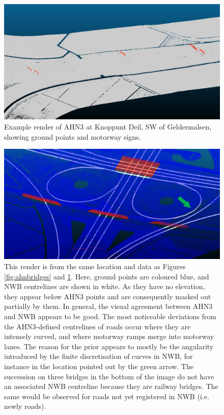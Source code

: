 \begin{figure}[h!]
    \centering
    \includegraphics[width=\linewidth]{final_report/figs/ahn_sample_02.png} 
    \caption{Example render of AHN3 at Knoppunt Deil, SW of Geldermalsen, showing ground points and motorway signs.}
    \label{fig:ahnsigns}
\end{figure}

\begin{figure}[h!]
    \centering
    \includegraphics[width=\linewidth]{final_report/figs/ahn_sample_04_a.png} 
    \caption{This render is from the same location and data as Figures \ref{fig:ahnbridges} and \ref{fig:ahnsigns}. Here, ground points are coloured blue, and NWB centrelines are shown in white. As they have no elevation, they appear below AHN3 points and are consequently masked out partially by them. In general, the visual agreement between AHN3 and NWB appears to be good. The most noticeable deviations from the AHN3-defined centrelines of roads occur where they are intensely curved, and where motorway ramps merge into motorway lanes. The reason for the prior appears to mostly be the angularity introduced by the finite discretisation of curves in NWB, for instance in the location pointed out by the green arrow. The succession on three bridges in the bottom of the image do not have an associated NWB centreline because they are railway bridges. The same would be observed for roads not yet registered in NWB (i.e. newly roads).}
    \label{fig:ahnnwb}
\end{figure}

